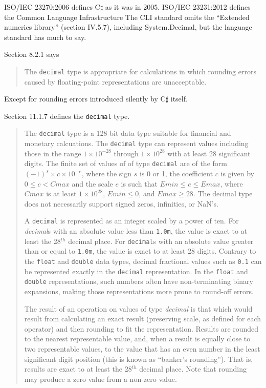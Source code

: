 \documentclass{article}
\begin{document}
ISO/IEC 23270:2006 defines C$\sharp$ as it was in 2005.
ISO/IEC 23231:2012 defines the Common Language Infrastructure
The CLI standard omits the ``Extended numerics library'' (section
IV.5.7), including System.Decimal, but the language standard
has much to say.

Section 8.2.1 says
\begin{quote}
The {\tt decimal} type is appropriate for calculations in which
rounding errors caused by floating-point representations are
unacceptable.
\end{quote}

Except for rounding errors introduced silently by C$\sharp$ itself.

Section 11.1.7 defines the {\tt decimal} type.
\begin{quote}
The {\tt decimal} type is a 128-bit data type suitable for
financial and monetary calcuations.  The {\tt decimal} type
can represent values including those in the range $1\times 10^{-28}$
through $1\times 10^{28}$ with at least 28 significant digits.
The finite set of values of of type {\tt decimal} are of the
form $(-1)^s\times c\times 10^{-e}$, where the sign $s$ is 0 or 1,
the coefficient $c$ is given by $0\le c<Cmax$ and the scale $e$
is such that $Emin\le e\le Emax$, where $Cmax$ is at least
$1\times 10^{28}$, $Emin\le 0$, and $Emax\ge 28$.  The decimal
type does not necessarily support signed zeros, infinities, or
NaN's.

A {\tt decimal} is represented as an integer scaled by a power of
ten.  For {\it decimal}s with an absolute value less than {\tt 1.0m},
the value is exact to at least the 28${}^{th}$ decimal place.
For {\tt decimal}s with an absolute value greater than or equal to
{\tt 1.0m}, the value is exact to at least 28 digits.  Contrary
to the {\tt float} and {\tt double} data types, decimal fractional
values such as {\tt 0.1} can be represented exactly in the
{\tt decimal} representation.  In the {\tt float} and {\tt double}
representations, such numbers often have non-terminating binary
expansions, making those representations more prone to round-off errors.

The result of an operation on values of type {\it decimal} is that
which would result from calculating an exact result (preserving
scale, as defined for each operator) and then rounding to fit the
representation.  Results are rounded to the nearest representable
value, and, when a result is equally close to two representable
values, to the value that has an even number in the least significant
digit position (this is known as ``banker's rounding'').  That is,
results are exact to at least the 28${}^{th}$ decimal place.
Note that rounding may produce a zero value from a non-zero value.


\end{quote}
\end{document}

